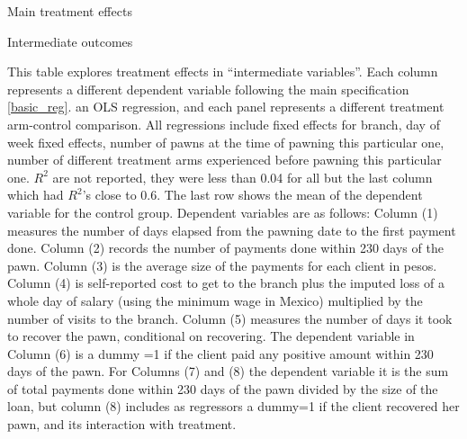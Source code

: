 \documentclass[oneside,11pt]{article}
\begin{document}
\newpage
\begin{landscape}
\vspace{.2in}

\begin{table}[H]
\caption{Main treatment effects}
\label{main_impact_table}
\begin{center}
\scriptsize{}
\end{center}

\end{table}



\newpage

\begin{table}[H]
\caption{Intermediate outcomes}
\label{mechanisms}
\begin{center}
\scriptsize{}
\end{center}

\end{table}

\scriptsize {
\noindent This table explores treatment effects in ``intermediate variables''. Each column represents a different dependent variable following the main specification \ref{basic_reg}.
an OLS regression, and each panel represents a different treatment arm-control comparison. All regressions include fixed effects for branch, day of week fixed effects, number of pawns at the time of pawning this particular one, number of different treatment arms experienced before pawning this particular one. $R^2$ are not reported, they were less than 0.04 for all but the last column which had $R^2$'s close to 0.6. The last row shows the mean of the dependent variable for the control group. Dependent variables are as follows: Column (1) measures the number of days elapsed from the pawning date to the first payment done. Column (2) records the number of payments done within 230 days of the pawn. Column (3) is the average size of the payments for each client in pesos. Column (4) is self-reported cost to get to the branch plus the imputed loss of a whole day of salary (using the minimum wage in Mexico) multiplied by the number of visits to the branch. Column (5) measures the number of days it took to recover the pawn, conditional on recovering. The dependent variable in Column (6) is a dummy =1 if the client paid any positive amount within 230 days of the pawn. For Columns (7) and (8) the dependent variable it is the sum of total payments done within 230 days of the pawn divided by the size of the loan, but column (8) includes as regressors a dummy=1 if the client recovered her pawn, and its interaction with treatment.
}

\vspace{3ex}

\end{landscape}
\end{document}
